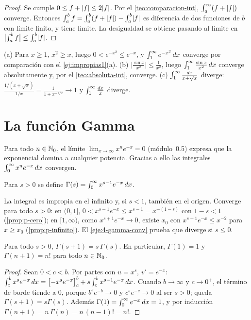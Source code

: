 \begin{proof}
Se cumple $0\le f+\lvert f\rvert\le2\lvert f\rvert$. Por el \cref{teo:comparacion-int}, $\int_a^{\infty}(f+\lvert f\rvert)$ converge. Entonces $\int_a^{b}f=\int_a^{b}(f+\lvert f\rvert)-\int_a^{b}\lvert f\rvert$ es diferencia de dos funciones de $b$ con límite finito, y tiene límite. La desigualdad se obtiene pasando al límite en $\bigl|\int_a^{b}f\bigr|\le\int_a^{b}\lvert f\rvert$.
\end{proof}

\begin{ejemplo}\label{ej:criterios}
(a) Para $x\ge1$, $x^{2}\ge x$, luego $0<e^{-x^{2}}\le e^{-x}$, y $\int_1^{\infty}e^{-x^{2}}\mathop{}\!d x$ converge por comparación con el \cref{ej:impropias1}(a).
(b) $\bigl|\frac{\sin x}{x^{2}}\bigr|\le\frac{1}{x^{2}}$, luego $\int_1^{\infty}\frac{\sin x}{x^{2}}\mathop{}\!d x$ converge absolutamente y, por el \cref{teo:absoluta-int}, converge.
(c) $\int_1^{\infty}\frac{\mathop{}\!d x}{x+\sqrt x}$ diverge: $\frac{1/(x+\sqrt x)}{1/x}=\frac{1}{1+x^{-1/2}}\to1$ y $\int_1^{\infty}\frac{\mathop{}\!d x}{x}$ diverge.
\end{ejemplo}

\section{La función Gamma}

Para todo $n\in\mathbb{N}_0$, el límite $\lim_{x\to\infty}x^{n}e^{-x}=0$ (módulo~0.5) expresa que la exponencial domina a cualquier potencia. Gracias a ello las integrales $\int_0^{\infty}x^{n}e^{-x}\mathop{}\!d x$ convergen.

\begin{definicion}\label{def:gamma}
Para $s>0$ se define $\Gamma(s)=\int_0^{\infty}x^{s-1}e^{-x}\mathop{}\!d x$.
\end{definicion}

La integral es impropia en el infinito y, si $s<1$, también en el origen. Converge para todo $s>0$: en $(0,1]$, $0<x^{s-1}e^{-x}\le x^{s-1}=x^{-(1-s)}$ con $1-s<1$ (\cref{prop:p-cero}); en $[1,\infty)$, como $x^{s+1}e^{-x}\to0$, existe $x_0$ con $x^{s-1}e^{-x}\le x^{-2}$ para $x\ge x_0$ (\cref{prop:p-infinito}). El \cref{eje:4-gamma-conv} prueba que diverge si $s\le0$.

\begin{proposicion}\label{prop:gamma-factorial}
Para todo $s>0$, $\Gamma(s+1)=s\,\Gamma(s)$. En particular, $\Gamma(1)=1$ y $\Gamma(n+1)=n!$ para todo $n\in\mathbb{N}_0$.
\end{proposicion}

\begin{proof}
Sean $0<c<b$. Por partes con $u=x^{s}$, $v'=e^{-x}$:
$\int_c^{b}x^{s}e^{-x}\mathop{}\!d x=\bigl[-x^{s}e^{-x}\bigr]_{c}^{b}+s\int_c^{b}x^{s-1}e^{-x}\mathop{}\!d x$.
Cuando $b\to\infty$ y $c\to0^{+}$, el término de borde tiende a $0$, porque $b^{s}e^{-b}\to0$ y $c^{s}e^{-c}\to0$ al ser $s>0$; queda $\Gamma(s+1)=s\Gamma(s)$. Además $\Gamma(1)=\int_0^{\infty}e^{-x}\mathop{}\!d x=1$, y por inducción $\Gamma(n+1)=n\,\Gamma(n)=n\,(n-1)!=n!$.
\end{proof}

